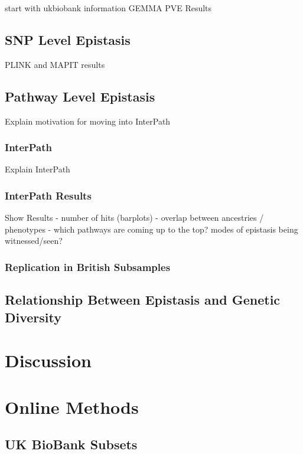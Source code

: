 \documentclass[12pt, a4paper]{article}
\begin{document}
start with ukbiobank information
GEMMA PVE Results

\subsection{SNP Level Epistasis}\label{InterPath-Results-SNPEpistasis}

PLINK and MAPIT results

\subsection{Pathway Level Epistasis}\label{InterPath-Results-SNPGenomeEpistasis}

Explain motivation for moving into InterPath

\subsubsection{InterPath}

Explain InterPath

\subsubsection{InterPath Results}

Show Results
 - number of hits (barplots)
 - overlap between ancestries / phenotypes
 - which pathways are coming up to the top? modes of epistasis being witnessed/seen?

\subsubsection{Replication in British Subsamples}

\subsection{Relationship Between Epistasis and Genetic Diversity}

\section{Discussion}\label{InterPath-Discussion}


\section{Online Methods}\label{InterPath-Online-Methods}

\subsection{UK BioBank Subsets}
\end{document}

